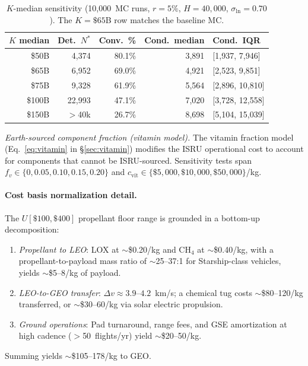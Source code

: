 \documentclass[preprint,12pt]{elsarticle}
\begin{document}
\begin{table}[htbp]
\centering
\caption{$K$-median sensitivity (10{,}000~MC runs, $r = 5\%$, $H = 40{,}000$, $\sigma_{\ln} = 0.70$). The $K = \$65$B row matches the baseline MC.}
\label{tab:k_median_sweep}
\small
\begin{tabular}{@{}rrrrl@{}}
\toprule
$K$ median & Det.\ $N^*$ & Conv.\ \% & Cond.\ median & Cond.\ IQR \\
\midrule
\$50B  & 4{,}374  & 80.1\% & 3{,}891  & [1{,}937, 7{,}946] \\
\$65B  & 6{,}952  & 69.0\% & 4{,}921  & [2{,}523, 9{,}851] \\
\$75B  & 9{,}328  & 61.9\% & 5{,}564  & [2{,}896, 10{,}810] \\
\$100B & 22{,}993 & 47.1\% & 7{,}020  & [3{,}728, 12{,}558] \\
\$150B & $>$40k   & 26.7\% & 8{,}698  & [5{,}104, 15{,}039] \\
\bottomrule
\end{tabular}
\end{table}

\emph{Earth-sourced component fraction (vitamin model).} The vitamin fraction model (Eq.~\ref{eq:vitamin} in \S\ref{sec:vitamin}) modifies the ISRU operational cost to account for components that cannot be ISRU-sourced. Sensitivity tests span $f_v \in \{0, 0.05, 0.10, 0.15, 0.20\}$ and $c_{\mathrm{vit}} \in \{\$5{,}000, \$10{,}000, \$50{,}000\}$/kg.

\paragraph{Cost basis normalization detail.} The $U[\$100, \$400]$ propellant floor range is grounded in a bottom-up decomposition:
\begin{enumerate}
  \item \emph{Propellant to LEO}: LOX at $\sim$\$0.20/kg and CH$_4$ at $\sim$\$0.40/kg, with a propellant-to-payload mass ratio of $\sim$25--37:1 for Starship-class vehicles, yields $\sim$\$5--8/kg of payload.
  \item \emph{LEO-to-GEO transfer}: $\Delta v \approx 3.9$--$4.2$~km/s; a chemical tug costs $\sim$\$80--120/kg transferred, or $\sim$\$30--60/kg via solar electric propulsion.
  \item \emph{Ground operations}: Pad turnaround, range fees, and GSE amortization at high cadence ($>$50~flights/yr) yield $\sim$\$20--50/kg.
\end{enumerate}
Summing yields $\sim$\$105--178/kg to GEO.
\end{document}

